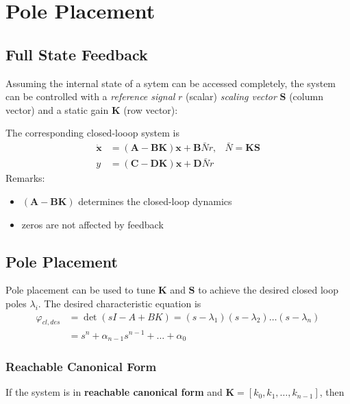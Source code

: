 \section{Pole Placement}

\subsection{Full State Feedback}
Assuming the internal state of a sytem can be accessed completely, the system can be controlled
with a \textit{reference signal} $r$ (scalar) \textit{scaling vector} $\mathbf{S}$ (column vector) and a static gain $\mathbf{K}$ (row vector):
\begin{center}
    
\end{center}
The corresponding closed-looop system is
\noindent\begin{align*}
    \dot{\mathbf{x}} & =(\mathbf{A}-\mathbf{BK})\mathbf{x}+\mathbf{B}\bar{N}r, & \bar{N}=\mathbf{KS} \\
    y                & =(\mathbf{C}-\mathbf{DK})\mathbf{x} +\mathbf{D}\bar{N}r
\end{align*}
Remarks:
\begin{itemize}
    \item $(\mathbf{A}-\mathbf{BK})$ determines the closed-loop dynamics
    \item zeros are not affected by feedback
\end{itemize}

\subsection{Pole Placement}\label{sec:pole_placement}
Pole placement can be used to tune $\mathbf{K}$ and $\mathbf{S}$ to achieve the desired closed loop poles $\lambda_i$.
The desired characteristic equation is
\noindent\begin{align*}
    \varphi_{cl,des} & =\det{(sI-A+BK)}=(s-\lambda_1)(s-\lambda_2)\ldots(s-\lambda_n) \\
                     & =s^n+\alpha_{n-1}s^{n-1}+\ldots+\alpha_0
\end{align*}

\subsubsection{Reachable Canonical Form}
If the system is in \textbf{reachable canonical form} and $\mathbf{K} = \left[k_0,k_1,\ldots,k_{n-1}\right]$, then

